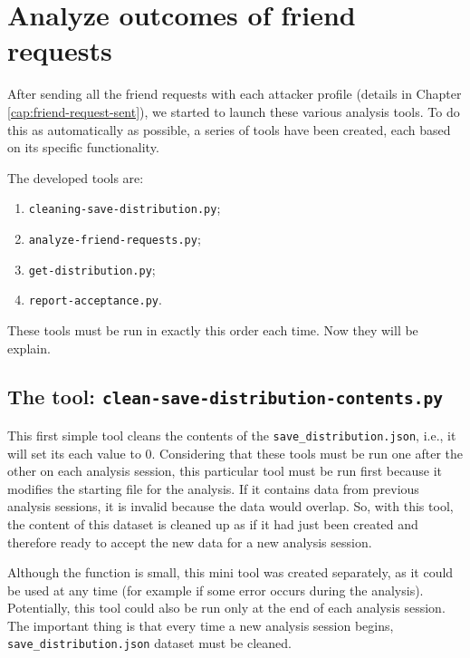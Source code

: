 \section{Analyze outcomes of friend requests}
After sending all the friend requests with each attacker profile (details in Chapter \ref{cap:friend-request-sent}), we started to launch these various analysis tools.
To do this as automatically as possible, a series of tools have been created, each based on its specific functionality.
\par \noindent The developed tools are:
\begin{enumerate}
	\item \texttt{cleaning-save-distribution.py};
	\item \texttt{analyze-friend-requests.py};
	\item \texttt{get-distribution.py};
	\item \texttt{report-acceptance.py}.
\end{enumerate}
These tools must be run in exactly this order each time. Now they will be explain.
\subsection{The tool: \texttt{clean-save-distribution-contents.py}}
This first simple tool cleans the contents of the \texttt{save\_distribution.json}, i.e., it will set its each value to 0. Considering that these tools must be run one after the other on each analysis session, this particular tool must be run first because it modifies the starting file for the analysis. If it contains data from previous analysis sessions, it is invalid because the data would overlap. So, with this tool, the content of this dataset is cleaned up as if it had just been created and therefore ready to accept the new data for a new analysis session.\par \noindent 
Although the function is small, this mini tool was created separately, as it could be used at any time (for example if some error occurs during the analysis). Potentially, this tool could also be run only at the end of each analysis session. The important thing is that every time a new analysis session begins, \texttt{save\_distribution.json} dataset must be cleaned.

